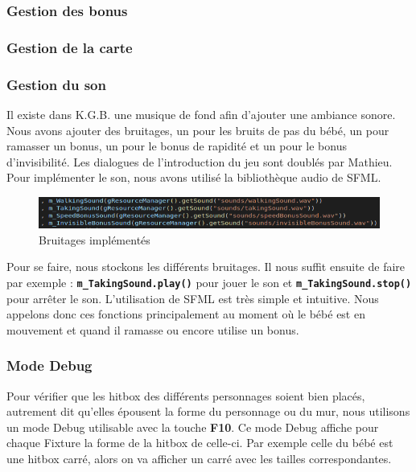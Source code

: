 \documentclass{article}
\begin{document}
\subsubsection{Gestion des bonus}

\subsubsection{Gestion de la carte}

\subsubsection{Gestion du son}
Il existe dans K.G.B. une musique de fond afin d'ajouter une ambiance sonore. Nous avons ajouter des bruitages, un pour les bruits de pas du bébé, un pour ramasser un bonus, un pour le bonus de rapidité et un pour le bonus d'invisibilité. Les dialogues de l'introduction du jeu sont doublés par Mathieu. 
Pour implémenter le son, nous avons utilisé la bibliothèque audio de SFML.
\begin{figure}[ht]
    \begin{center}
    \includegraphics[scale=0.61]{images/baby_sounds.png}
    \caption{Bruitages implémentés}
    \label{baby_sounds}
    \end{center}
\end{figure}
Pour se faire, nous stockons les différents bruitages. Il nous suffit ensuite de faire par exemple : \texttt{\textbf{m\_TakingSound.play()}} pour jouer le son et \texttt{\textbf{m\_TakingSound.stop()}} pour arrêter le son. L'utilisation de SFML est très simple et intuitive. Nous appelons donc ces fonctions principalement au moment où le bébé est en mouvement et quand il ramasse ou encore utilise un bonus.

\subsubsection{Mode \og Debug\fg}
Pour vérifier que les hitbox des différents personnages soient bien placés, autrement dit qu'elles épousent la forme du personnage ou du mur, nous utilisons un mode Debug utilisable avec la touche \textbf{F10}. Ce mode Debug affiche pour chaque Fixture la forme de la hitbox de celle-ci. Par exemple celle du bébé est une hitbox carré, alors on va afficher un carré avec les tailles correspondantes.
\end{document}
